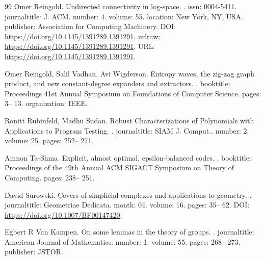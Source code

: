 \documentclass[10pt,a4paper]{article}
\theoremstyle{definition}
\theoremstyle{remark}
\numberwithin{equation}{section}
\begin{document}
\begin{thebibliography}{99}
Omer Reingold.
\newblock Undirected connectivity in log-space.
.
\newblock issn: 0004-5411.
\newblock journaltitle: J. ACM.
\newblock number: 4.
\newblock volume: 55.
\newblock location: New York, NY, USA.
\newblock publisher: Association for Computing Machinery.
\newblock DOI: \url{https://doi.org/10.1145/1391289.1391291}.
\newblock urlraw: \url{https://doi.org/10.1145/1391289.1391291}.
\newblock URL: \url{https://doi.org/10.1145/1391289.1391291}.

Omer Reingold, Salil Vadhan, Avi Wigderson.
\newblock Entropy waves, the zig-zag graph product, and new constant-degree expanders and extractors.
.
\newblock booktitle: Proceedings 41st Annual Symposium on Foundations of Computer Science.
\newblock pages: 3-- 13.
\newblock organization: IEEE.

Ronitt Rubinfeld, Madhu Sudan.
\newblock Robust Characterizations of Polynomials with Applications to Program Testing.
.
\newblock journaltitle: {SIAM} J. Comput..
\newblock number: 2.
\newblock volume: 25.
\newblock pages: 252-- 271.

Amnon Ta-Shma.
\newblock Explicit, almost optimal, epsilon-balanced codes.
.
\newblock booktitle: Proceedings of the 49th Annual ACM SIGACT Symposium on Theory of Computing.
\newblock pages: 238-- 251.

David Surowski.
\newblock Covers of simplicial complexes and applications to geometry.
.
\newblock journaltitle: Geometriae Dedicata.
\newblock month: 04.
\newblock volume: 16.
\newblock pages: 35-- 62.
\newblock DOI: \url{https://doi.org/10.1007/BF00147420}.

Egbert R Van Kampen.
\newblock On some lemmas in the theory of groups.
.
\newblock journaltitle: American Journal of Mathematics.
\newblock number: 1.
\newblock volume: 55.
\newblock pages: 268-- 273.
\newblock publisher: JSTOR.

\end{thebibliography}
\end{document}
